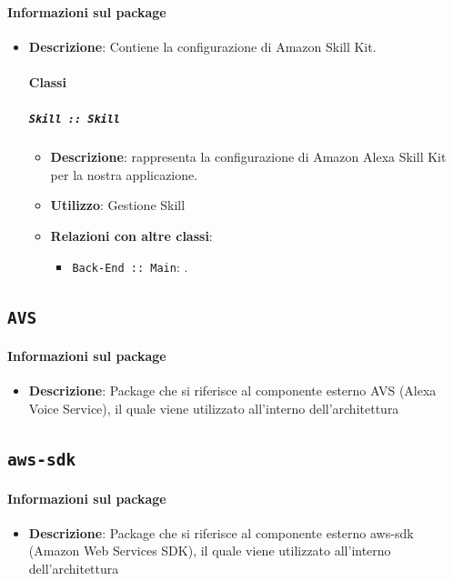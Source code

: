 \documentclass[../DefinizioneDiProdotto.tex]{subfiles}
\begin{document}
\paragraph{Informazioni sul package}\begin{itemize}\item \textbf{Descrizione}: Contiene la configurazione di Amazon Skill Kit.\paragraph{Classi}
	\subparagraph{\texttt{Skill :: Skill}}
	\begin{itemize}\item \textbf{Descrizione}: rappresenta la configurazione di Amazon Alexa Skill Kit per la nostra applicazione.
	\item \textbf{Utilizzo}: Gestione Skill
	\item \textbf{Relazioni con altre classi}:
	\begin{itemize}
	\item \texttt{Back-End :: Main}: .
	\end{itemize}
	\end{itemize}\end{itemize}


\subsection{ \texttt{AVS}}\paragraph{Informazioni sul package}\begin{itemize}\item \textbf{Descrizione}: Package che si riferisce al componente esterno AVS (Alexa Voice Service), il quale viene utilizzato all'interno dell'architettura\end{itemize}

\subsection{ \texttt{aws-sdk}}\paragraph{Informazioni sul package}\begin{itemize}\item \textbf{Descrizione}: Package che si riferisce al componente esterno aws-sdk (Amazon Web Services SDK), il quale viene utilizzato all'interno dell'architettura\end{itemize}
\end{document}
